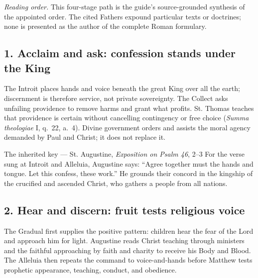 \begin{deepstudy}
\noindent\emph{Reading order.} This four-stage path is the guide's source-grounded synthesis of the appointed order. The cited Fathers expound particular texts or doctrines; none is presented as the author of the complete Roman formulary.

\subsection*{1. Acclaim and ask: confession stands under the King\enspace{}}

The Introit places hands and voice beneath the great King over all the earth; discernment is therefore service, not private sovereignty. The Collect asks unfailing providence to remove harms and grant what profits. St. Thomas teaches that providence is certain without cancelling contingency or free choice (\emph{Summa theologiae} I, q.~22, a.~4). Divine government orders and assists the moral agency demanded by Paul and Christ; it does not replace it.

\begin{sourcecard}{The inherited key --- St. Augustine, \emph{Exposition on Psalm 46}, 2--3}
For the verse sung at Introit and Alleluia, Augustine says: ``Agree together must the hands and tongue. Let this confess, these work.'' He grounds their concord in the kingship of the crucified and ascended Christ, who gathers a people from all nations.
\end{sourcecard}

\subsection*{2. Hear and discern: fruit tests religious voice\enspace{}}

The Gradual first supplies the positive pattern: children hear the fear of the Lord and approach him for light. Augustine reads Christ teaching through ministers and the faithful approaching by faith and charity to receive his Body and Blood. The Alleluia then repeats the command to voice-and-hands before Matthew tests prophetic appearance, teaching, conduct, and obedience.


\end{deepstudy}
